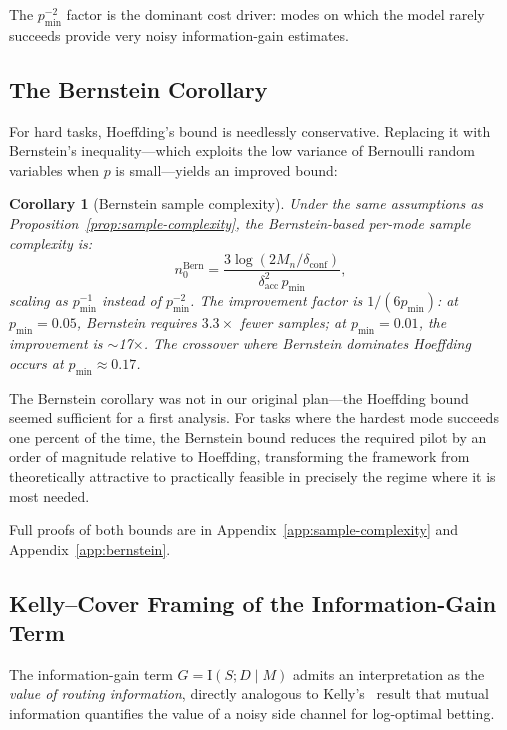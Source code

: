 \documentclass[twoside,11pt]{article}
\newtheorem{corollary}{Corollary}
\newcommand{\Mn}{M_n}
\newcommand{\pmin}{p_{\min}}
\newcommand{\dacc}{\delta_{\mathrm{acc}}}
\newcommand{\dconf}{\delta_{\mathrm{conf}}}
\newcommand{\MI}{\mathrm{I}}
\newcommand{\appref}[1]{Appendix~\ref{#1}}
\begin{document}
The $\pmin^{-2}$ factor is the dominant cost driver: modes on which the model rarely succeeds provide very noisy information-gain estimates.

\subsection{The Bernstein Corollary}
\label{sec:bernstein}

For hard tasks, Hoeffding's bound is needlessly conservative.
Replacing it with Bernstein's inequality---which exploits the low variance of Bernoulli random variables when $p$ is small---yields an improved bound:

\begin{corollary}[Bernstein sample complexity]
\label{cor:bernstein}
Under the same assumptions as Proposition~\ref{prop:sample-complexity}, the Bernstein-based per-mode sample complexity is:
\begin{equation}
\label{eq:bernstein-sample}
  n_0^{\mathrm{Bern}} = \frac{3\log(2\Mn/\dconf)}{\dacc^2\,\pmin},
\end{equation}
scaling as $\pmin^{-1}$ instead of $\pmin^{-2}$.
The improvement factor is $1/(6\pmin)$: at $\pmin = 0.05$, Bernstein requires $3.3\times$ fewer samples; at $\pmin = 0.01$, the improvement is $\sim$17$\times$.
The crossover where Bernstein dominates Hoeffding occurs at $\pmin \approx 0.17$.
\end{corollary}

The Bernstein corollary was not in our original plan---the Hoeffding bound seemed sufficient for a first analysis.
For tasks where the hardest mode succeeds one percent of the time, the Bernstein bound reduces the required pilot by an order of magnitude relative to Hoeffding, transforming the framework from theoretically attractive to practically feasible in precisely the regime where it is most needed.

Full proofs of both bounds are in \appref{app:sample-complexity} and \appref{app:bernstein}.

\subsection{Kelly--Cover Framing of the Information-Gain Term}
\label{sec:kelly-cover}

The information-gain term $G = \MI(S; D \mid M)$ admits an interpretation as the \emph{value of routing information}, directly analogous to Kelly's~\citeyearpar{kelly1956new} result that mutual information quantifies the value of a noisy side channel for log-optimal betting.
\end{document}
